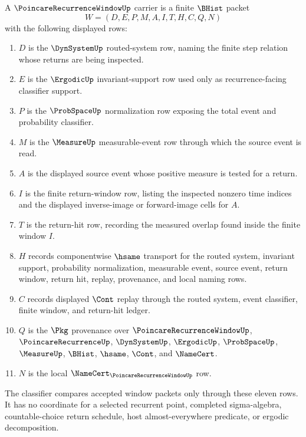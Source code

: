 \begin{definition}
\label{def:poincare-recurrence-window-carrier}
A $\PoincareRecurrenceWindowUp$ carrier is a finite $\BHist$ packet
$$
W=(D,E,P,M,A,I,T,H,C,Q,N)
$$
with the following displayed rows:
\begin{enumerate}
\item $D$ is the $\DynSystemUp$ routed-system row, naming the finite step relation whose returns are being inspected.
\item $E$ is the $\ErgodicUp$ invariant-support row used only as recurrence-facing classifier support.
\item $P$ is the $\ProbSpaceUp$ normalization row exposing the total event and probability classifier.
\item $M$ is the $\MeasureUp$ measurable-event row through which the source event is read.
\item $A$ is the displayed source event whose positive measure is tested for a return.
\item $I$ is the finite return-window row, listing the inspected nonzero time indices and the displayed inverse-image or forward-image cells for $A$.
\item $T$ is the return-hit row, recording the measured overlap found inside the finite window $I$.
\item $H$ records componentwise $\hsame$ transport for the routed system, invariant support, probability normalization, measurable event, source event, return window, return hit, replay, provenance, and local naming rows.
\item $C$ records displayed $\Cont$ replay through the routed system, event classifier, finite window, and return-hit ledger.
\item $Q$ is the $\Pkg$ provenance over $\PoincareRecurrenceWindowUp$, $\PoincareRecurrenceUp$, $\DynSystemUp$, $\ErgodicUp$, $\ProbSpaceUp$, $\MeasureUp$, $\BHist$, $\hsame$, $\Cont$, and $\NameCert$.
\item $N$ is the local $\NameCert_{\PoincareRecurrenceWindowUp}$ row.
\end{enumerate}
The classifier compares accepted window packets only through these eleven rows. It has no coordinate for a selected recurrent point, completed sigma-algebra, countable-choice return schedule, host almost-everywhere predicate, or ergodic decomposition.
\end{definition}

